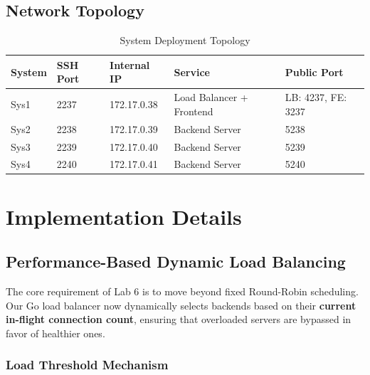 \documentclass[12pt, a4paper]{article}
\begin{document}
\subsection{Network Topology}

\begin{table}[H]
\centering
\caption{System Deployment Topology}
\label{tab:topology}
\begin{tabular}{llllp{4cm}}
\toprule
\textbf{System} & \textbf{SSH Port} & \textbf{Internal IP} & \textbf{Service} & \textbf{Public Port} \\
\midrule
Sys1 & 2237 & 172.17.0.38 & Load Balancer + Frontend & LB: 4237, FE: 3237 \\
Sys2 & 2238 & 172.17.0.39 & Backend Server & 5238 \\
Sys3 & 2239 & 172.17.0.40 & Backend Server & 5239 \\
Sys4 & 2240 & 172.17.0.41 & Backend Server & 5240 \\
\bottomrule
\end{tabular}
\end{table}


\section{Implementation Details}

\subsection{Performance-Based Dynamic Load Balancing}

The core requirement of Lab 6 is to move beyond fixed Round-Robin scheduling. Our Go load balancer now dynamically selects backends based on their \textbf{current in-flight connection count}, ensuring that overloaded servers are bypassed in favor of healthier ones.

\subsubsection{Load Threshold Mechanism}
\end{document}
